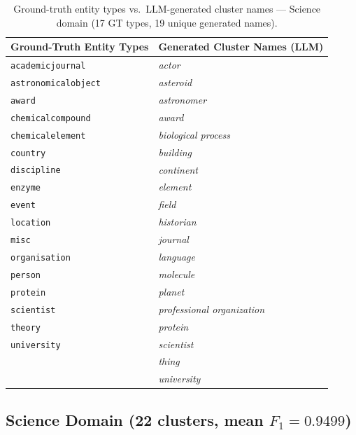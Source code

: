 \documentclass[11pt,a4paper]{article}
\begin{document}
\begin{table}[ht]
\centering
\footnotesize
\caption{Ground-truth entity types vs.\ LLM-generated cluster names --- Science domain
(17 GT types, 19 unique generated names).}
\label{tab:gt_map_science}
\setlength{\tabcolsep}{8pt}
\begin{tabular}{l l}
\toprule
\textbf{Ground-Truth Entity Types} & \textbf{Generated Cluster Names (LLM)} \\
\midrule
  \texttt{academicjournal} & \textit{actor} \\
  \texttt{astronomicalobject} & \textit{asteroid} \\
  \texttt{award} & \textit{astronomer} \\
  \texttt{chemicalcompound} & \textit{award} \\
  \texttt{chemicalelement} & \textit{biological process} \\
  \texttt{country} & \textit{building} \\
  \texttt{discipline} & \textit{continent} \\
  \texttt{enzyme} & \textit{element} \\
  \texttt{event} & \textit{field} \\
  \texttt{location} & \textit{historian} \\
  \texttt{misc} & \textit{journal} \\
  \texttt{organisation} & \textit{language} \\
  \texttt{person} & \textit{molecule} \\
  \texttt{protein} & \textit{planet} \\
  \texttt{scientist} & \textit{professional organization} \\
  \texttt{theory} & \textit{protein} \\
  \texttt{university} & \textit{scientist} \\
   & \textit{thing} \\
   & \textit{university} \\
\bottomrule
\end{tabular}
\end{table}

\FloatBarrier

\subsection{Science Domain (22 clusters, mean $F_1 = 0.9499$)}
\end{document}
